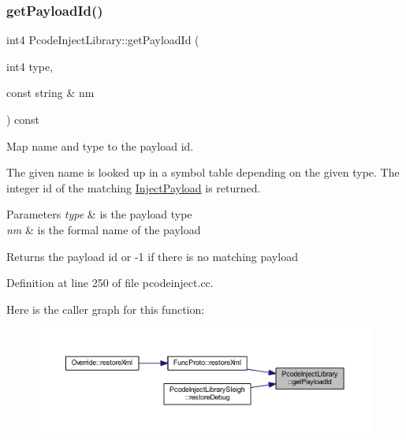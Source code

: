 \subsubsection{\texorpdfstring{getPayloadId()}{getPayloadId()}}
{\footnotesize\ttfamily int4 Pcode\+Inject\+Library\+::get\+Payload\+Id (\begin{DoxyParamCaption}\item[{int4}]{type,  }\item[{const string \&}]{nm }\end{DoxyParamCaption}) const}



Map name and type to the payload id. 

The given name is looked up in a symbol table depending on the given type. The integer id of the matching \mbox{\hyperlink{class_inject_payload}{Inject\+Payload}} is returned. 
\begin{DoxyParams}{Parameters}
{\em type} & is the payload type \\
\hline
{\em nm} & is the formal name of the payload \\
\hline
\end{DoxyParams}
\begin{DoxyReturn}{Returns}
the payload id or -\/1 if there is no matching payload 
\end{DoxyReturn}


Definition at line 250 of file pcodeinject.\+cc.

Here is the caller graph for this function\+:
\nopagebreak
\begin{figure}[H]
\begin{center}
\leavevmode
\includegraphics[width=350pt]{class_pcode_inject_library_ad49624d6aa508e6e75d7c23f9c839c02_icgraph}
\end{center}
\end{figure}
\mbox{\label{class_pcode_inject_library_a6ec47b3f3836fdd9116a9755ad1727c4}} 

